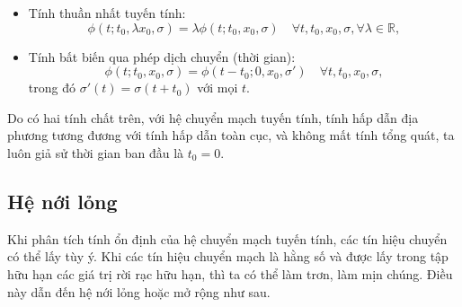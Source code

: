 \documentclass[14pt,a4paper,oneside]{report}		%
\theoremstyle{definition}
\begin{document}
\begin{itemize}
\item[\textasteriskcentered] Tính thuần nhất tuyến tính:
\begin{equation} \label{eq2-18}
\phi (t;t_0,\lambda x_0,\sigma) = \lambda \phi (t;t_0,x_0,\sigma)\quad \forall t,t_0,x_0,\sigma , \forall \lambda\in\mathbb{R},
\end{equation}
\item[\textasteriskcentered] Tính bất biến qua phép dịch chuyển (thời gian):
\begin{equation} \label{eq2-19}
\phi (t;t_0,x_0,\sigma) = \phi (t-t_0;0,x_0,\sigma')\quad \forall t,t_0,x_0,\sigma,
\end{equation}
trong đó $\sigma'(t)=\sigma(t+t_0)$ với mọi $t$.
\end{itemize}
Do có hai tính chất trên, với hệ chuyển mạch tuyến tính, tính hấp dẫn địa phương tương đương với tính hấp dẫn toàn cục, và không mất tính tổng quát, ta luôn giả sử thời gian ban đầu là $t_0 = 0$.

\subsection{Hệ nới lỏng}
Khi phân tích tính ổn định của hệ chuyển mạch tuyến tính, các tín hiệu chuyển có thể lấy tùy ý. Khi các tín hiệu chuyển mạch là hằng số và được lấy trong tập hữu hạn các giá trị rời rạc hữu hạn, thì ta có thể làm trơn, làm mịn chúng. Điều này dẫn đến hệ nới lỏng hoặc mở rộng như sau.\\
\end{document}
